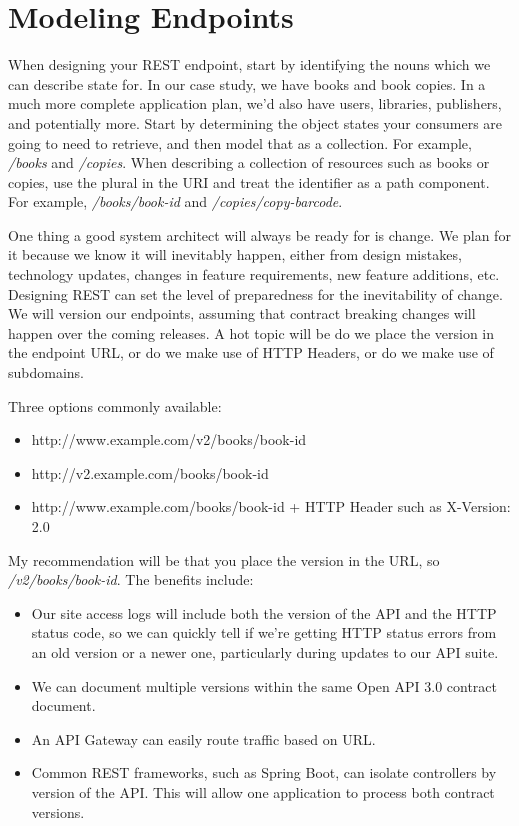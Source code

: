\section{Modeling Endpoints}

When designing your REST endpoint, start by identifying the nouns which we can describe state for.  In our case study, we have books and book copies.  In a much more complete application plan, we'd also have users, libraries, publishers, and potentially more.  Start by determining the object states your consumers are going to need to retrieve, and then model that as a collection.  For example, \textit{/books} and \textit{/copies}.  When describing a collection of resources such as books or copies, use the plural in the URI and treat the identifier as a path component.  For example, \textit{/books/book-id} and \textit{/copies/copy-barcode}.

One thing a good system architect will always be ready for is change.  We plan for it because we know it will inevitably happen, either from design mistakes, technology updates, changes in feature requirements, new feature additions, etc.  Designing REST can set the level of preparedness for the inevitability of change.  We will version our endpoints, assuming that contract breaking changes will happen over the coming releases.  A hot topic will be do we place the version in the endpoint URL, or do we make use of HTTP Headers, or do we make use of subdomains.

Three options commonly available:

\begin{itemize}
  \item http://www.example.com/v2/books/book-id
  \item http://v2.example.com/books/book-id
  \item http://www.example.com/books/book-id + HTTP Header such as X-Version: 2.0
\end{itemize}

My recommendation will be that you place the version in the URL, so \textit{/v2/books/book-id}.  The benefits include:
\begin{itemize}
  \item Our site access logs will include both the version of the API and the HTTP status code, so we can quickly tell if we're getting HTTP status errors from an old version or a newer one, particularly during updates to our API suite.
  \item We can document multiple versions within the same Open API 3.0 contract document.
  \item An API Gateway can easily route traffic based on URL.
  \item Common REST frameworks, such as Spring Boot, can isolate controllers by version of the API.  This will allow one application to process both contract versions.
\end{itemize}

